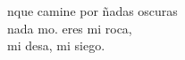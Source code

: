 \begin{cancion}[Mi roca][Ixcís]%
	nque camine por ñadas oscuras\\
	nada mo.  eres mi roca,\\
	mi desa, mi siego.\\
\end{cancion}%
